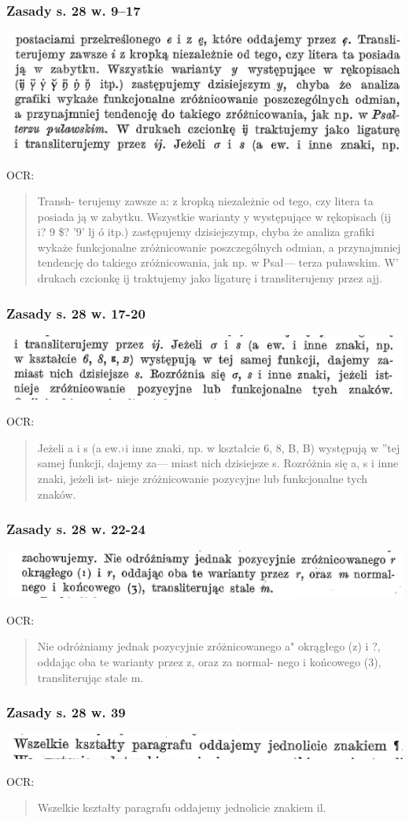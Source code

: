 \documentclass[pdfpagemode=UseNone]{beamer}
\begin{document}
\begin{frame}
  \frametitle{Zasady s. 28 w. 9--17}
  \includegraphics[width=\hsize]{img/Zasady28_9-17}

  OCR:
  \begin{quote}
  Transh-
terujemy zawsze a: z kropką niezależnie od tego, czy litera ta posiada
ją w zabytku. Wszystkie warianty y występujące w rękopisach
(ij i? 9 \$? '9' lj ó itp.) zastępujemy dzisiejszymp, chyba że analiza
grafiki wykaże funkcjonalne zróżnicowanie poszczególnych odmian,
a przynajmniej tendencję do takiego zróżnicowania, jak np. w Psał—
terza puławskim. W' drukach czcionkę ij traktujemy jako ligaturę
i transliterujemy przez ajj. 
\end{quote}
\end{frame}

\begin{frame}
  \frametitle{Zasady s. 28 w. 17-20}
  \includegraphics[width=\hsize]{img/Zasady28_17-20}

  OCR:
  \begin{quote}
  Jeżeli a i s (a ew.›i inne znaki, np.
w kształcie 6, 8, B, B) występują w ”tej samej funkcji, dajemy za—
miast nich dzisiejsze s. Rozróżnia się a, s i inne znaki, jeżeli ist-
nieje zróżnicowanie pozycyjne lub funkcjonalne tych znaków.
\end{quote}
\end{frame}

\begin{frame}
  \frametitle{Zasady s. 28 w. 22-24}
  \includegraphics[width=\hsize]{img/Zasady28_22-24}

  OCR:
  \begin{quote}
  Nie odróżniamy jednak pozycyjnie zróżnicowanego a"
okrągłego (z) i ?, oddając oba te warianty przez z, oraz za normal-
nego i końcowego (3), transliterując stale m.
\end{quote}
\end{frame}

\begin{frame}
  \frametitle{Zasady s. 28 w. 39}
  \includegraphics[width=\hsize]{img/Zasady28_39}

  OCR:
  \begin{quote}
  Wszelkie kształty paragrafu oddajemy jednolicie znakiem il.
\end{quote}
\end{frame}
\end{document}
